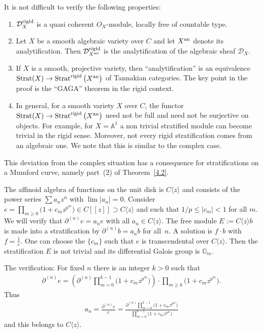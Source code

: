 \documentclass[10pt,a4paper]{amsart}
\numberwithin{equation}{section}
\begin{document}
It is not difficult to verify the following properties:
\begin{enumerate}\itemsep=0pt
\item[(a)] $\mathcal{D}^{\rm rigid}_X$ is a quasi coherent $O_X$-module, locally free of countable type.
\item[(b)] Let $X$ be a smooth algebraic variety over $C$ and let $X^{\rm an}$ denote its analytification. Then $\mathcal{D}_{X^{\rm an}}^{\rm rigid}$ is the analytification of the algebraic sheaf $\mathcal{D}_X$.
\item[(c)] If $X$ is a smooth, projective variety, then ``analytification'' is an equivalence $\operatorname{Strat}(X)\rightarrow \operatorname{Strat}^{\rm rigid}\big(X^{\rm an}\big)$ of Tannakian categories. The key point in the proof is the ``GAGA'' theorem in the rigid context.
\item[(d)] In general, for a smooth variety $X$ over $C$, the functor $\operatorname{Strat}(X)\rightarrow \operatorname{Strat}^{\rm rigid}\big(X^{\rm an}\big)$ need not be full and need not be surjective on objects. For example, for $X=\mathbb{A}^1$ a non trivial stratified module can become trivial in the rigid sense. Moreover, not every rigid stratification comes from an algebraic one. We note that this is similar to the complex case.
\end{enumerate}

\begin{Example}\label{4.1} This deviation from the complex situation has a consequence for stratifications on a Mumford curve, namely part~(2) of Theorem~\ref{4.2}.

The affinoid algebra of functions on the unit disk is $C\langle z\rangle$ and consists of the power series $\sum a_nz^n$ with $\lim |a_n|=0$. Consider $e=\prod\limits_{m\geq 0}\big(1+ c_mz^{p^m}\big)\in C[[z]]\supset C\langle z\rangle$ and such that $1/p \leq |c_m|<1$ for all $m$. We will verify that $\partial^{(n)}e=a_ne$ with all $a_n\in C\langle z\rangle $. The free module $E:=C\langle z\rangle b$ is made into a stratification by $\partial^{(n)}b=a_nb$ for all~$n$. A solution is $f\cdot b$ with $f=\frac{1}{e}$. One can choose the $\{c_m\}$ such that $e$ is transcendental over $C\langle z\rangle$. Then the stratification $E$ is not trivial and its differential Galois group is $\mathbb{G}_m$.

 The verification: For fixed $n$ there is an integer $k>0$ such that
\begin{gather*} \partial^{(n)}e= \left(\partial^{(n) }\prod_{m=0}^{k-1} \big(1+c_mz^{p^m}\big)\right)\cdot \prod_{m\geq k}\big(1+c_mz^{p^m}\big).\end{gather*}
 Thus \begin{gather*} a_n=\frac{\partial^{(n)}e}{e}=\frac{\partial^{(n)}\prod\limits_{m=0}^{k-1} \big(1+c_mz^{p^m}\big)}{\prod\limits_{m=0}^{k-1} \big(1+c_mz^{p^m}\big)}\end{gather*} and this belongs to $C\langle z\rangle$. \end{Example}
\end{document}
